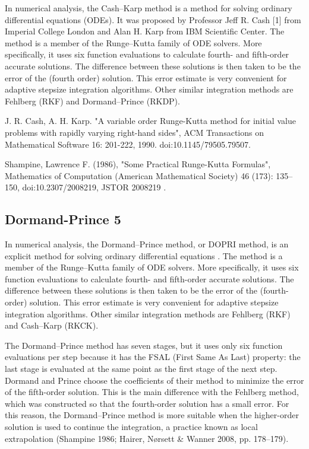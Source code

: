 In numerical analysis, the Cash–Karp method is a method for solving ordinary differential equations (ODEs). It was proposed by Professor Jeff R. Cash [1] from Imperial College London and Alan H. Karp from IBM Scientific Center. The method is a member of the Runge–Kutta family of ODE solvers. More specifically, it uses six function evaluations to calculate fourth- and fifth-order accurate solutions. The difference between these solutions is then taken to be the error of the (fourth order) solution. This error estimate is very convenient for adaptive stepsize integration algorithms. Other similar integration methods are Fehlberg (RKF) and Dormand–Prince (RKDP).

J. R. Cash, A. H. Karp. "A variable order Runge-Kutta method for initial value problems with rapidly varying right-hand sides", ACM Transactions on Mathematical Software 16: 201-222, 1990. doi:10.1145/79505.79507.

Shampine, Lawrence F. (1986), "Some Practical Runge-Kutta Formulas", Mathematics of Computation (American Mathematical Society) 46 (173): 135–150, doi:10.2307/2008219, JSTOR 2008219 .



\subsection{Dormand-Prince 5}
\label{DormandPrince}

In numerical analysis, the Dormand–Prince method, or DOPRI method, is an explicit method for solving ordinary differential equations \citep{Dormand1980}. The method is a member of the Runge–Kutta family of ODE solvers. More specifically, it uses six function evaluations to calculate fourth- and fifth-order accurate solutions. The difference between these solutions is then taken to be the error of the (fourth-order) solution. This error estimate is very convenient for adaptive stepsize integration algorithms. Other similar integration methods are Fehlberg (RKF) and Cash–Karp (RKCK).

The Dormand–Prince method has seven stages, but it uses only six function evaluations per step because it has the FSAL (First Same As Last) property: the last stage is evaluated at the same point as the first stage of the next step. Dormand and Prince choose the coefficients of their method to minimize the error of the fifth-order solution. This is the main difference with the Fehlberg method, which was constructed so that the fourth-order solution has a small error. For this reason, the Dormand–Prince method is more suitable when the higher-order solution is used to continue the integration, a practice known as local extrapolation (Shampine 1986; Hairer, Nørsett \& Wanner 2008, pp. 178–179).

